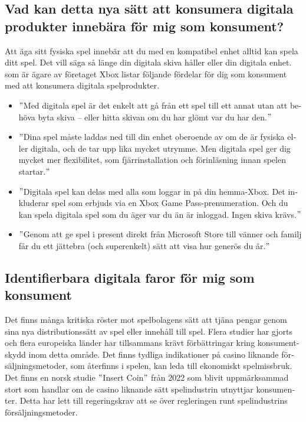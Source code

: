 \documentclass[11p]{article}
\begin{document}
\begin{otherlanguage}{swedish}
        \setlength{\leftskip}{0cm}



       \subsection{Vad kan detta nya sätt att konsumera digitala produkter innebära för mig som konsument?}
        Att äga sitt fysiska spel innebär att du med en kompatibel enhet alltid kan spela ditt spel.
        Det vill säga så länge din digitala skiva håller eller din digitala enhet.
        \textcite{support} som är ägare av företaget Xbox listar följande fördelar för dig som konsument med att konsumera digitala spelprodukter.
        \begin{itemize}
            \item \("\)Med digitala spel är det enkelt att gå från ett spel till ett annat utan att behöva byta skiva – eller hitta skivan om du har glömt var du har den.\("\)
            \item \("\)Dina spel måste laddas ned till din enhet oberoende av om de är fysiska eller digitala, och de tar upp lika mycket utrymme. Men digitala spel ger dig mycket mer flexibilitet, som fjärrinstallation och förinläsning innan spelen startar.\("\)
            \item \("\)Digitala spel kan delas med alla som loggar in på din hemma-Xbox. Det inkluderar spel som erbjuds via en Xbox Game Pass-prenumeration. Och du kan spela digitala spel som du äger var du än är inloggad. Ingen skiva krävs.\("\)
            \item \("\)Genom att ge spel i present direkt från Microsoft Store till vänner och familj får du ett jättebra (och superenkelt) sätt att visa hur generös du är.\("\)
        \end{itemize}

        
        \subsection{Identifierbara digitala faror för mig som konsument}

        Det finns många kritiska röster mot spelbolagens sätt att tjäna pengar genom sina nya distributionssätt av spel eller innehåll till spel.
        Flera studier har gjorts och flera europeiska länder har tillsammans krävt förbättringar kring konsumentskydd inom detta område.
        Det finns tydliga indikationer på casino liknande försäljningsmetoder, som återfinns i spelen, kan leda till ekonomiskt spelmissbruk.
        Det finns en norsk studie \("\)Insert Coin\("\) från 2022 som blivit uppmärksammad stort som handlar om de casino liknande sätt spelindustrin utnyttjar konsumenter.
        Detta har lett till regeringskrav att se över regleringen runt spelindustrins försäljningsmetoder.


\end{otherlanguage}
\end{document}
